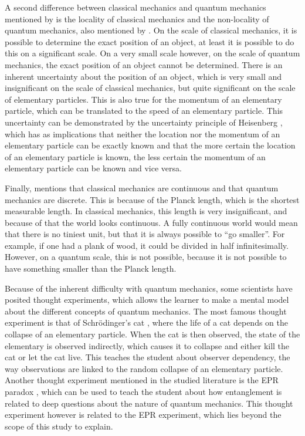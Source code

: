 \documentclass[11pt,twoside]{report} %
\begin{document}
A second difference between classical mechanics and quantum mechanics mentioned by  is the locality of classical mechanics and the non-locality of quantum mechanics, also mentioned by . On the scale of classical mechanics, it is possible to determine the exact position of an object, at least it is possible to do this on a significant scale. On a very small scale however, on the scale of quantum mechanics, the exact position of an object  cannot be determined. There is an inherent uncertainty about the position of an object, which is very small and insignificant on the scale of classical mechanics, but quite significant on the scale of elementary particles. This is also true for the momentum of an elementary particle, which can be translated to the speed of an elementary particle. This uncertainty can be demonstrated by the uncertainty principle of Heisenberg \cite{henriksen, muller, velentzas}, which has as implications that neither the location nor the momentum of an elementary particle can be exactly known and that the more certain the location of an elementary particle is known, the less certain the momentum of an elementary particle can be known and vice versa.

Finally,  mentions that classical mechanics are continuous and that quantum mechanics are discrete. This is because of the Planck length, which is the shortest measurable length. In classical mechanics, this length is very insignificant, and because of that the world looks continuous. A fully continuous world would mean that there is no tiniest unit, but that it is always possible to “go smaller”. For example, if one had a plank of wood, it could be divided in half infinitesimally. However, on a quantum scale, this is not possible, because it is not possible to have something smaller than the Planck length.

Because of the inherent difficulty with quantum mechanics, some scientists have posited thought experiments, which allows the learner to make a mental model about the different concepts of quantum mechanics. The most famous thought experiment is that of Schrödinger's cat \cite{muller, velentzas}, where the life of a cat depends on the collapse of an elementary particle. When the cat is then observed, the state of the elementary is observed indirectly, which causes it to collapse and either kill the cat or let the cat live. This teaches the student about observer dependency, the way observations are linked to the random collapse of an elementary particle. Another thought experiment mentioned in the studied literature is the EPR paradox \cite{kuttner, muller, velentzas}, which can be used to teach the student about how entanglement is related to deep questions about the nature of quantum mechanics. This thought experiment however is related to the EPR experiment, which lies beyond the scope of this study to explain.
\end{document}
